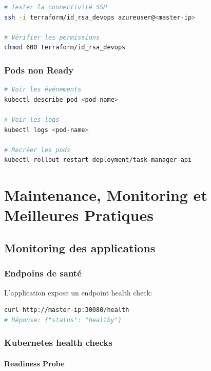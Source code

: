 \documentclass[12pt,a4paper,twoside]{report}
\begin{document}
\begin{lstlisting}[language=bash]
# Tester la connectivité SSH
ssh -i terraform/id_rsa_devops azureuser@<master-ip>

# Vérifier les permissions
chmod 600 terraform/id_rsa_devops
\end{lstlisting}

\subsection{Pods non Ready}

\begin{lstlisting}[language=bash]
# Voir les événements
kubectl describe pod <pod-name>

# Voir les logs
kubectl logs <pod-name>

# Recréer les pods
kubectl rollout restart deployment/task-manager-api
\end{lstlisting}

\newpage

\chapter{Maintenance, Monitoring et Meilleures Pratiques}

\section{Monitoring des applications}

\subsection{Endpoins de santé}

L'application expose un endpoint health check:

\begin{lstlisting}[language=bash]
curl http://master-ip:30080/health
# Réponse: {"status": "healthy"}
\end{lstlisting}

\subsection{Kubernetes health checks}

\subsubsection{Readiness Probe}
\end{document}
